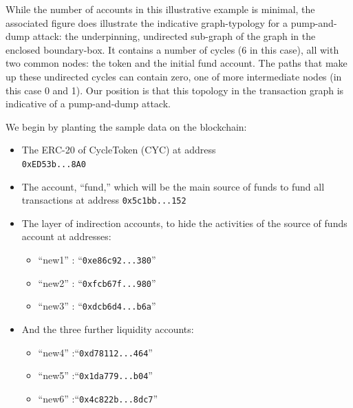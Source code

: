 \documentclass[conference]{IEEEtran}
\begin{document}
While the number of accounts in this illustrative example is minimal, the associated figure does illustrate the indicative graph-typology for a pump-and-dump attack: the underpinning, undirected sub-graph of the graph in the enclosed boundary-box. It contains a number of cycles (6 in this case), all with two common nodes: the token and the initial fund account. The paths that make up these undirected cycles can contain zero, one of more intermediate nodes (in this case 0 and 1). Our position is that this topology in the transaction graph is indicative of a pump-and-dump attack. 


We begin by planting the sample data on the blockchain:
\begin{itemize}
    \item The ERC-20 of CycleToken (CYC) at address \\ {\tiny\texttt{0xED53b...8A0}}
    \item The account, ``fund,'' which will be the main source of funds to fund all transactions at address {\tiny\texttt{0x5c1bb...152}}
    \item The layer of indirection accounts, to hide the activities of the source of funds account at addresses:
    \begin{itemize}
        \item ``new1'' : ``{\tiny\texttt{0xe86c92...380}}''
        \item ``new2'' : ``{\tiny\texttt{0xfcb67f...980}}''
        \item ``new3'' : ``{\tiny\texttt{0xdcb6d4...b6a}}''
    \end{itemize}
    \item And the three further liquidity accounts:
    \begin{itemize}
        \item ``new4'' :``{\tiny\texttt{0xd78112...464}}''
        \item ``new5'' :``{\tiny\texttt{0x1da779...b04}}''
        \item ``new6'' :``{\tiny\texttt{0x4c822b...8dc7}}''
    \end{itemize}
\end{itemize}
\end{document}
